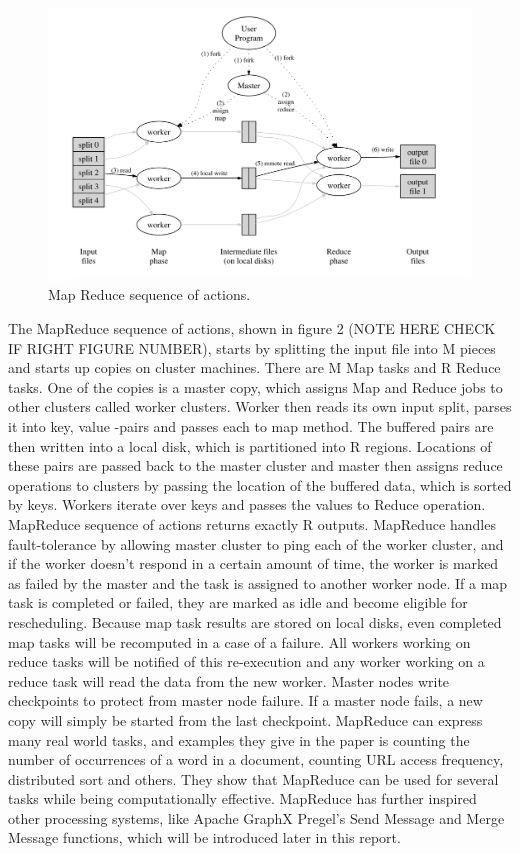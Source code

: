 \documentclass{article}
\theoremstyle{definition}
\begin{document}
\begin{figure}[H]
\centering
\includegraphics[scale=0.4]{mapreducefigure}
\caption{Map Reduce sequence of actions. }
\end{figure}

The MapReduce sequence of actions, shown in figure 2 (NOTE HERE CHECK IF RIGHT FIGURE NUMBER), starts by splitting the input file into M pieces and starts up copies on cluster machines. There are M Map tasks and R Reduce tasks. One of the copies is a master copy, which assigns Map and Reduce jobs to other clusters called worker clusters. Worker then reads its own input split, parses it into key, value -pairs and passes each to map method. The buffered pairs are then written into a local disk, which is partitioned into R regions. Locations of these pairs are passed back to the master cluster and master then assigns reduce operations to clusters by passing the location of the buffered data, which is sorted by keys. Workers iterate over keys and passes the values to Reduce operation. MapReduce sequence of actions returns exactly R outputs. 
MapReduce handles fault-tolerance by allowing master cluster to ping each of the worker cluster, and if the worker doesn't respond in a certain amount of time, the worker is marked as failed by the master and the task is assigned to another worker node. If a map task is completed or failed, they are marked as idle and become eligible for rescheduling. Because map task results are stored on local disks, even completed map tasks will be recomputed in a case of a failure. All workers working on reduce tasks will be notified of this re-execution and any worker working on a reduce task will read the data from the new worker. Master nodes write checkpoints to protect from master node failure. If a master node fails, a new copy will simply be started from the last checkpoint.
MapReduce can express many real world tasks, and examples they give in the paper is counting the number of occurrences of a word in a document, counting URL access frequency, distributed sort and others. They show that MapReduce can be used for several tasks while being computationally effective. MapReduce has further inspired other processing systems, like Apache GraphX Pregel's Send Message and Merge Message functions, which will be introduced later in this report. \\ 
\end{document}
